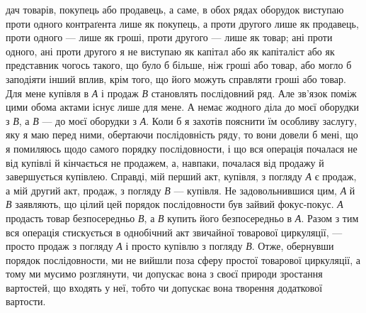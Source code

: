 \parcont{}  %
дач товарів, покупець або продавець, а саме, в обох рядах оборудок
виступаю проти одного контраґента лише як покупець, а
проти другого лише як продавець, проти одного — лише як
гроші, проти другого — лише як товар; ані проти одного, ані
проти другого я не виступаю як капітал або як капіталіст або
як представник чогось такого, що було б більше, ніж гроші або
товар, або могло б заподіяти інший вплив, крім того, що його
можуть справляти гроші або товар. Для мене купівля в \emph{А} і продаж
\emph{В} становлять послідовний ряд. Але зв’язок поміж цими
обома актами існує лише для мене. А немає жодного діла до моєї
оборудки з \emph{В}, а \emph{В} — до моєї оборудки з \emph{А}. Коли б я захотів
пояснити їм особливу заслугу, яку я маю перед ними, обертаючи
послідовність ряду, то вони довели б мені, що я помиляюсь щодо
самого порядку послідовности, і що вся операція почалася не
від купівлі й кінчається не продажем, а, навпаки, почалася від
продажу й завершується купівлею. Справді, мій перший акт,
купівля, з погляду \emph{А} є продаж, а мій другий акт, продаж, з
погляду \emph{В} — купівля. Не задовольнившися цим, \emph{А} й \emph{В} заявляють,
що цілий цей порядок послідовности був зайвий фокус-покус.
\emph{А} продасть товар безпосередньо \emph{В}, а \emph{В} купить його безпосередньо
в \emph{А}. Разом з тим вся операція стискується в однобічний
акт звичайної товарової циркуляції, — просто продаж з погляду
\emph{А} і просто купівлю з погляду \emph{В}. Отже, обернувши порядок послідовности,
ми не вийшли поза сферу простої товарової циркуляції,
а тому ми мусимо розглянути, чи допускає вона з своєї природи
зростання вартостей, що входять у неї, тобто чи допускає вона
творення додаткової вартости.

